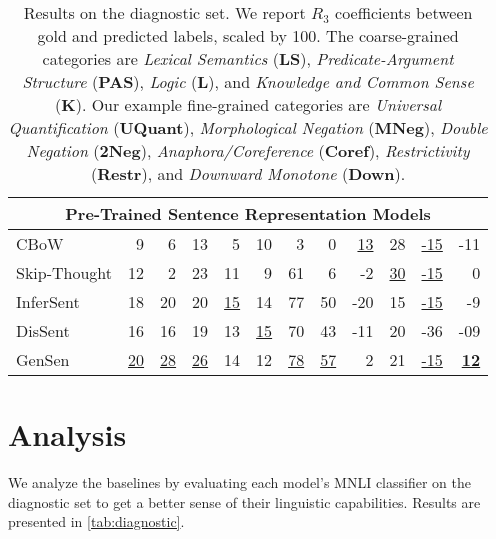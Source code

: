 \documentclass{article} \usepackage{iclr2019_conference,times}
\begin{document}
\begin{table*}[t]
\begin{tabular}{lr@{\hskip 3em}rrrr@{\hskip 3em}rrrrrr}
\midrule
\multicolumn{12}{c}{Pre-Trained Sentence Representation Models} \\
\midrule
CBoW & 9 & 6 & 13 & 5 & 10 & 3 & 0 & \underline{13} & 28 & \underline{-15} & -11 \\
Skip-Thought & 12 & 2 & 23 & 11 & 9 & 61 & 6 & -2 & \underline{30} & \underline{-15} & 0 \\
InferSent & 18 & 20 & 20 & \underline{15} & 14 & 77 & 50 & -20 & 15 & \underline{-15} & -9 \\
DisSent & 16 & 16 & 19 & 13 & \underline{15} & 70 & 43 & -11 & 20 & -36 & -09 \\
GenSen & \underline{20} & \underline{28} & \underline{26} & 14 & 12 & \underline{78} & \underline{57} & 2 & 21 & \underline{-15} & \textbf{\underline{12}} \\
\bottomrule
\end{tabular}
\caption{Results on the diagnostic set. We report \(R_3\) coefficients between gold and predicted labels, scaled by 100.
The coarse-grained categories are \textit{Lexical Semantics} (\textbf{LS}),
\textit{Predicate-Argument Structure} (\textbf{PAS}),
\textit{Logic} (\textbf{L}),
and \textit{Knowledge and Common Sense} (\textbf{K}). Our example fine-grained categories are \textit{Universal Quantification} (\textbf{UQuant}),
\textit{Morphological Negation} (\textbf{MNeg}),
\textit{Double Negation} (\textbf{2Neg}),
\textit{Anaphora/Coreference} (\textbf{Coref}), \textit{Restrictivity} (\textbf{Restr}), and \textit{Downward Monotone} (\textbf{Down}).}
\label{tab:diagnostic}
\end{table*}





\section{Analysis}

We analyze the baselines by evaluating each model's MNLI classifier on the diagnostic set to get a better sense of their linguistic capabilities.
Results are presented in \autoref{tab:diagnostic}.
\end{document}
